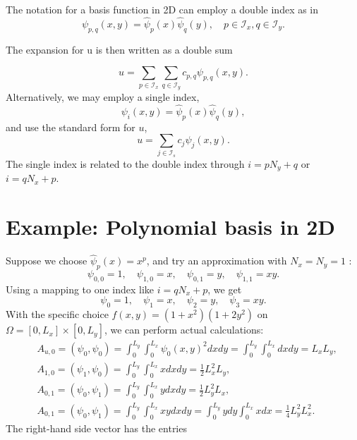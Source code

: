 \documentclass[../main.tex]{subfiles}
\begin{document}
The notation for a basis function in 2D can employ a double index as in
$$
\psi_{p, q}(x, y)=\hat{\psi}_{p}(x) \hat{\psi}_{q}(y), \quad p \in \mathcal{I}_{x}, q \in \mathcal{I}_{y}.
$$

The expansion for u is then written as a double sum

$$
u=\sum_{p \in \mathcal{I}_{x}} \sum_{q \in \mathcal{I}_{y}} c_{p, q} \psi_{p, q}(x, y).
$$
Alternatively, we may employ a single index,
$$
\psi_{i}(x, y)=\hat{\psi}_{p}(x) \hat{\psi}_{q}(y),
$$
and use the standard form for $u$,
$$
u=\sum_{j \in \mathcal{I}_{s}} c_{j} \psi_{j}(x, y).
$$
The single index is related to the double index through $i=p N_{y}+q$ or $i=q N_{x}+p$.
\bigbreak

\section[Example: Polynomial basis in 2D]{Example: Polynomial basis in 2D}
\label{sec:sec_8_2}
\noindent Suppose we choose $\hat{\psi}_{p}(x)=x^{p}$, and try an approximation with $N_{x}=N_{y}=1$ :
$$
\psi_{0,0}=1, \quad \psi_{1,0}=x, \quad \psi_{0,1}=y, \quad \psi_{1,1}=x y.
$$
Using a mapping to one index like $i=q N_{x}+p$, we get
$$
\psi_{0}=1, \quad \psi_{1}=x, \quad \psi_{2}=y, \quad \psi_{3}=x y.
$$
With the specific choice $f(x, y)=\left(1+x^{2}\right)\left(1+2 y^{2}\right)$ on $\Omega=\left[0, L_{x}\right] \times\left[0, L_{y}\right]$, we can perform actual calculations:
$$
\begin{aligned}
	&A_{u, 0}=\left(\psi_{0}, \psi_{0}\right)=\int_{0}^{L_{y}} \int_{0}^{L_{x}} \psi_{0}(x, y)^{2} d x d y=\int_{0}^{L_{y}} \int_{0}^{L_{x}} d x d y=L_{x} L_{y}, \\
	&A_{1,0}=\left(\psi_{1}, \psi_{0}\right)=\int_{0}^{L_{y}} \int_{0}^{L_{x}} x d x d y=\frac{1}{2} L_{x}^{2} L_{y}, \\
	&A_{0,1}=\left(\psi_{0}, \psi_{1}\right)=\int_{0}^{L_{y}} \int_{0}^{L_{x}} y d x d y=\frac{1}{2} L_{y}^{2} L_{x}, \\
	&A_{0,1}=\left(\psi_{0}, \psi_{1}\right)=\int_{0}^{L_{y}} \int_{0}^{L_{x}} x y d x d y=\int_{0}^{L_{y}} y d y \int_{0}^{L_{x}} x d x=\frac{1}{4} L_{y}^{2} L_{x}^{2}.
\end{aligned}
$$
The right-hand side vector has the entries
\end{document}
